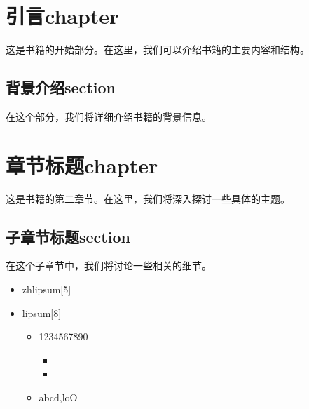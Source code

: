 \documentclass[oneside]{styles/kaobok2}
\begin{document}

\frontmatter %
\if@twoside 
    
    \maketitle
\else 
    \maketitle
    
\fi
\frontmatter



\mainmatter %


\chapter{引言chapter}
这是书籍的开始部分。在这里，我们可以介绍书籍的主要内容和结构。

\lipsum[1] %

\zhlipsum[1]

\section{背景介绍section}
在这个部分，我们将详细介绍书籍的背景信息。

\lipsum[2-3] %

\zhlipsum[2]

\chapter{章节标题chapter}
这是书籍的第二章节。在这里，我们将深入探讨一些具体的主题。

\lipsum[4-5] %

\zhlipsum[3]

\section{子章节标题section}
在这个子章节中，我们将讨论一些相关的细节。

\lipsum[6-7] %

\zhlipsum[4]

\begin{itemize}
    \item zhlipsum[5]
    \item lipsum[8]
    \begin{itemize}
        \item 1234567890
        \begin{itemize}
            \item \zhlipsum[5]
            \item \lipsum[8]
        \end{itemize}
        \item abcd,loO
    \end{itemize}
\end{itemize}
\end{document}
